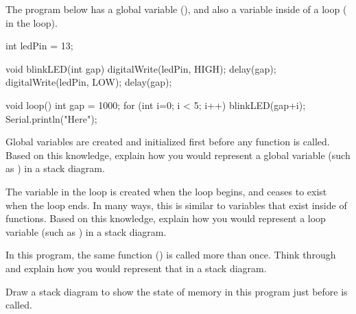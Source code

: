 \newpage


The program below has a global variable (), and also a variable
inside of a loop ( in the  loop).


\begin{javalst}

  int ledPin = 13;
  
  void blinkLED(int gap) {
    digitalWrite(ledPin, HIGH);
    delay(gap);
    digitalWrite(ledPin, LOW);
    delay(gap);
  }
  
  void loop() {
    int gap = 1000;
    for (int i=0; i < 5; i++) {
      blinkLED(gap+i);
    }
    Serial.println("Here");
  }

\end{javalst}

\Q Global variables are created and initialized first before any function is
called. Based on this knowledge, explain how you would represent a global
variable (such as ) in a stack diagram.

\vspace{2cm}

\Q The variable  in the  loop is created when the 
loop begins, and ceases to exist when the  loop ends. In many ways,
this is similar to variables that exist inside of functions. Based on this
knowledge, explain how you would represent a loop variable (such as ) in
a stack diagram.

\vspace{2cm}


\Q In this program, the same function () is called more than
once. Think through and explain how you would represent that in a stack diagram.

\vspace{2cm}

\Q \label{drawing}
Draw a stack diagram to show the state of memory in this program just before  is called.




